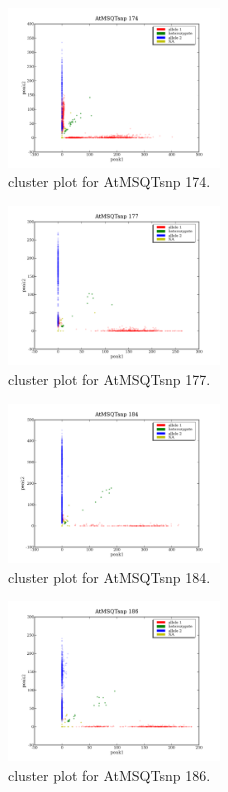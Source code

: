 \begin{figure}[H]
\includegraphics[width=0.5\textwidth]{figures/cluster_plot_AtMSQTsnp_174.png}
\caption{cluster plot for AtMSQTsnp 174.} \label{flAtMSQTsnp174}
\end{figure}

\begin{figure}[H]
\includegraphics[width=0.5\textwidth]{figures/cluster_plot_AtMSQTsnp_177.png}
\caption{cluster plot for AtMSQTsnp 177.} \label{flAtMSQTsnp177}
\end{figure}

\begin{figure}[H]
\includegraphics[width=0.5\textwidth]{figures/cluster_plot_AtMSQTsnp_184.png}
\caption{cluster plot for AtMSQTsnp 184.} \label{flAtMSQTsnp184}
\end{figure}

\begin{figure}[H]
\includegraphics[width=0.5\textwidth]{figures/cluster_plot_AtMSQTsnp_186.png}
\caption{cluster plot for AtMSQTsnp 186.} \label{flAtMSQTsnp186}
\end{figure}

